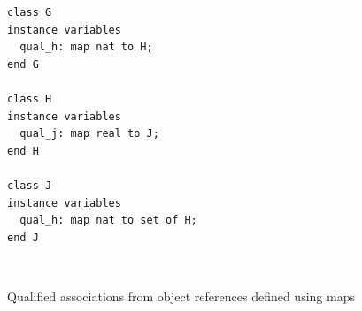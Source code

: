 \documentclass[\pformat,12pt]{article}
\begin{document}
\begin{figure}[htb]
\begin{center}
\hspace{-1cm}
\begin{minipage}[t]{2.5in}
\begin{verbatim}  
class G  
instance variables  
  qual_h: map nat to H;  
end G  
  
class H  
instance variables  
  qual_j: map real to J;  
end H  
  
class J  
instance variables  
  qual_h: map nat to set of H;  
end J  
\end{verbatim}
\end{minipage} \ \
\begin{minipage}[t]{2.5in}
\vspace{1cm}
\end{minipage}
\caption{Qualified associations from object references defined using maps\label{fig:classG}}
\end{center}
\end{figure}
\end{document}
